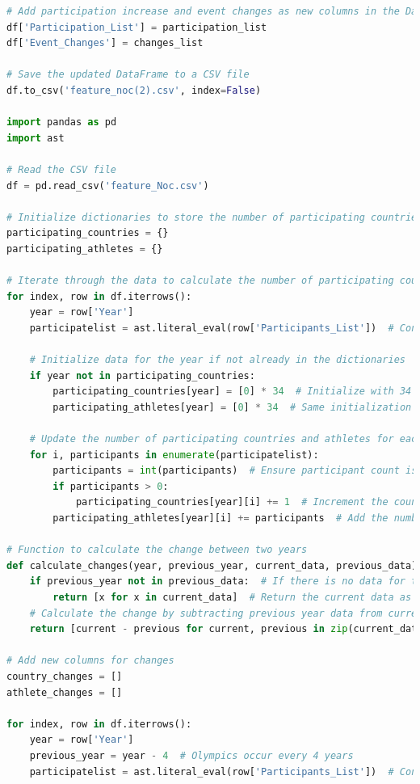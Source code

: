 \documentclass[12pt]{article}
\begin{document}
\begin{lstlisting}[language=Python, style=mystyle, caption=data\_analyze.ipynb]
# Add participation increase and event changes as new columns in the DataFrame
df['Participation_List'] = participation_list
df['Event_Changes'] = changes_list

# Save the updated DataFrame to a CSV file
df.to_csv('feature_noc(2).csv', index=False)

import pandas as pd
import ast

# Read the CSV file
df = pd.read_csv('feature_Noc.csv')

# Initialize dictionaries to store the number of participating countries and athletes per year
participating_countries = {}
participating_athletes = {}

# Iterate through the data to calculate the number of participating countries and athletes per year
for index, row in df.iterrows():
    year = row['Year']
    participatelist = ast.literal_eval(row['Participants_List'])  # Convert string to a list
    
    # Initialize data for the year if not already in the dictionaries
    if year not in participating_countries:
        participating_countries[year] = [0] * 34  # Initialize with 34 sports (or categories)
        participating_athletes[year] = [0] * 34  # Same initialization for athletes
    
    # Update the number of participating countries and athletes for each sport
    for i, participants in enumerate(participatelist):
        participants = int(participants)  # Ensure participant count is an integer
        if participants > 0:
            participating_countries[year][i] += 1  # Increment the country count if participants > 0
        participating_athletes[year][i] += participants  # Add the number of participants

# Function to calculate the change between two years
def calculate_changes(year, previous_year, current_data, previous_data):
    if previous_year not in previous_data:  # If there is no data for the previous year
        return [x for x in current_data]  # Return the current data as the change
    # Calculate the change by subtracting previous year data from current year data
    return [current - previous for current, previous in zip(current_data, previous_data[previous_year])]

# Add new columns for changes
country_changes = []
athlete_changes = []

for index, row in df.iterrows():
    year = row['Year']
    previous_year = year - 4  # Olympics occur every 4 years
    participatelist = ast.literal_eval(row['Participants_List'])  # Convert string to a list
    

\end{lstlisting}
\end{document}

